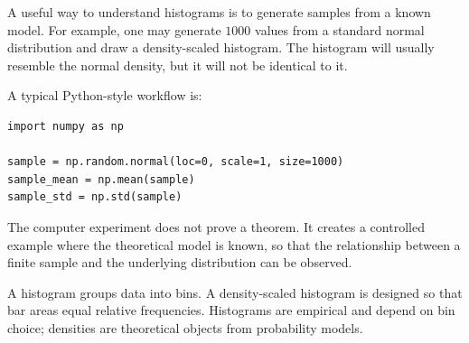 A useful way to understand histograms is to generate samples from a known model.
For example, one may generate \(1000\) values from a standard normal distribution
and draw a density-scaled histogram. The histogram will usually resemble the
normal density, but it will not be identical to it.

A typical Python-style workflow is:
\begin{verbatim}
import numpy as np

sample = np.random.normal(loc=0, scale=1, size=1000)
sample_mean = np.mean(sample)
sample_std = np.std(sample)
\end{verbatim}

The computer experiment does not prove a theorem. It creates a controlled
example where the theoretical model is known, so that the relationship between a
finite sample and the underlying distribution can be observed.

\begin{summarybox}
A histogram groups data into bins. A density-scaled histogram is designed so that
bar areas equal relative frequencies. Histograms are empirical and depend on bin
choice; densities are theoretical objects from probability models.
\end{summarybox}
